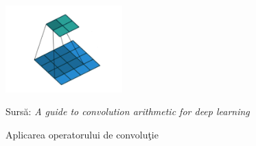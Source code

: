 \documentclass[a4paper,12pt]{report}
\newcommand{\source}[1]{\caption*{Sursă: {#1}} }
\begin{document}
\begin{figure}
	  \begin{center}
       \includegraphics[width=0.4\textwidth]{images/convolution_operator}
       \caption{Aplicarea operatorului de convoluţie}
			\label{fig:convolution_operator}
       \source {\emph{A guide to convolution arithmetic for deep learning} \cite{dumoulin2016guide}}
    \end{center}
\end{figure}
\end{document}
